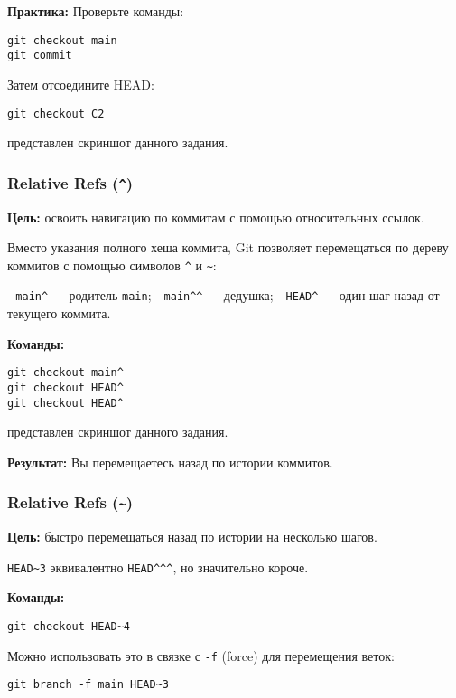 \documentclass[a4paper,12pt]{report}
\begin{document}
\textbf{Практика:} Проверьте команды:
\begin{verbatim}
git checkout main
git commit
\end{verbatim}

Затем отсоедините HEAD:
\begin{verbatim}
git checkout C2
\end{verbatim}

 представлен скриншот данного задания.

\subsubsection{Relative Refs (\texttt{\^{}})}
\textbf{Цель:} освоить навигацию по коммитам с помощью относительных ссылок.

Вместо указания полного хеша коммита, Git позволяет перемещаться по дереву коммитов с помощью символов \texttt{\^{}} и \texttt{\~{}}:

- \texttt{main\^} — родитель \texttt{main};
- \texttt{main\^{}}\texttt{\^{}} — дедушка;
- \texttt{HEAD\^} — один шаг назад от текущего коммита.

\textbf{Команды:}
\begin{verbatim}
git checkout main^
git checkout HEAD^
git checkout HEAD^
\end{verbatim}

 представлен скриншот данного задания.

\textbf{Результат:} Вы перемещаетесь назад по истории коммитов.

\subsubsection{Relative Refs (\texttt{\~})}
\textbf{Цель:} быстро перемещаться назад по истории на несколько шагов.

\texttt{HEAD\textasciitilde 3} эквивалентно \texttt{HEAD\^{}\^{}\^{}}, но значительно короче.

\textbf{Команды:}
\begin{verbatim}
git checkout HEAD~4
\end{verbatim}

Можно использовать это в связке с \texttt{-f} (force) для перемещения веток:
\begin{verbatim}
git branch -f main HEAD~3
\end{verbatim}
\end{document}
